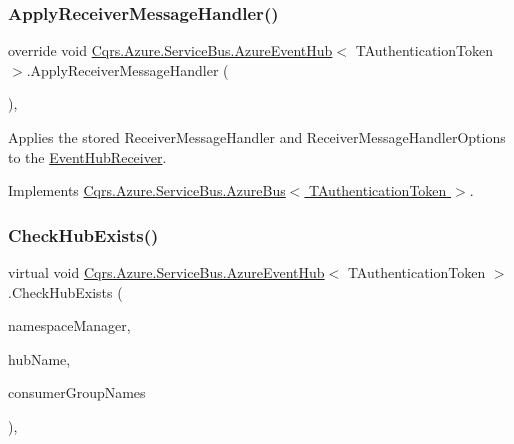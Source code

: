\subsubsection{\texorpdfstring{Apply\+Receiver\+Message\+Handler()}{ApplyReceiverMessageHandler()}}
{\footnotesize\ttfamily override void \hyperlink{classCqrs_1_1Azure_1_1ServiceBus_1_1AzureEventHub}{Cqrs.\+Azure.\+Service\+Bus.\+Azure\+Event\+Hub}$<$ T\+Authentication\+Token $>$.Apply\+Receiver\+Message\+Handler (\begin{DoxyParamCaption}{ }\end{DoxyParamCaption})\hspace{0.3cm}{\ttfamily [protected]}, {\ttfamily [virtual]}}



Applies the stored Receiver\+Message\+Handler and Receiver\+Message\+Handler\+Options to the \hyperlink{classCqrs_1_1Azure_1_1ServiceBus_1_1AzureEventHub_a1b12b47dbb9b9afe2014477a2e457c35_a1b12b47dbb9b9afe2014477a2e457c35}{Event\+Hub\+Receiver}. 



Implements \hyperlink{classCqrs_1_1Azure_1_1ServiceBus_1_1AzureBus_aad25a164e9e526c59d8ef98635c98095_aad25a164e9e526c59d8ef98635c98095}{Cqrs.\+Azure.\+Service\+Bus.\+Azure\+Bus$<$ T\+Authentication\+Token $>$}.

\mbox{\label{classCqrs_1_1Azure_1_1ServiceBus_1_1AzureEventHub_ac62e15208566056ffad05f46a303de8f_ac62e15208566056ffad05f46a303de8f}} 
\subsubsection{\texorpdfstring{Check\+Hub\+Exists()}{CheckHubExists()}}
{\footnotesize\ttfamily virtual void \hyperlink{classCqrs_1_1Azure_1_1ServiceBus_1_1AzureEventHub}{Cqrs.\+Azure.\+Service\+Bus.\+Azure\+Event\+Hub}$<$ T\+Authentication\+Token $>$.Check\+Hub\+Exists (\begin{DoxyParamCaption}\item[{Namespace\+Manager}]{namespace\+Manager,  }\item[{string}]{hub\+Name,  }\item[{string}]{consumer\+Group\+Names }\end{DoxyParamCaption})\hspace{0.3cm}{\ttfamily [protected]}, {\ttfamily [virtual]}}



